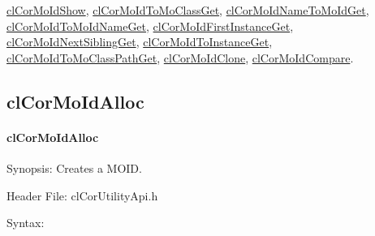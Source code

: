 \begin{flushleft}
\begin{Desc}
\hyperlink{pagecor119}{cl\-Cor\-MoId\-Show}, \hyperlink{pagecor120}{cl\-Cor\-MoId\-To\-Mo\-Class\-Get}, 
\hyperlink{pagecor121}{cl\-Cor\-MoId\-Name\-To\-MoId\-Get}, \hyperlink{pagecor122}{cl\-Cor\-MoId\-To\-MoId\-Name\-Get}, 
\hyperlink{pagecor123}{cl\-Cor\-MoId\-First\-Instance\-Get}, \hyperlink{pagecor124}{cl\-Cor\-MoId\-Next\-Sibling\-Get}, 
 \hyperlink{pagecor125}{cl\-Cor\-MoId\-To\-Instance\-Get}, 
\hyperlink{pagecor126}{cl\-Cor\-MoId\-To\-Mo\-Class\-Path\-Get}, \hyperlink{pagecor127}{cl\-Cor\-MoId\-Clone}, 
\hyperlink{pagecor128}{cl\-Cor\-MoId\-Compare}. \end{Desc}
\newpage




\subsection{clCorMoIdAlloc}
\hypertarget{pagecor113}{}\paragraph{cl\-Cor\-MoId\-Alloc}\label{pagecor113}
\begin{Desc}
\item[Synopsis:]Creates a MOID.\end{Desc}
\begin{Desc}
\item[Header File:]clCorUtilityApi.h\end{Desc}
\begin{Desc}
\item[Syntax:]


\end{Desc}
\end{flushleft}
